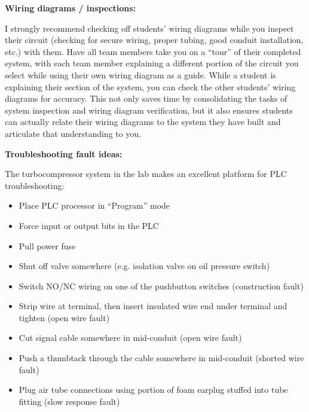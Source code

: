 







\noindent
{\bf Wiring diagrams / inspections:}

I strongly recommend checking off students' wiring diagrams while you inspect their circuit (checking for secure wiring, proper tubing, good conduit installation, etc.) with them.  Have all team members take you on a ``tour'' of their completed system, with each team member explaining a different portion of the circuit you select while using their own wiring diagram as a guide.  While a student is explaining their section of the system, you can check the other students' wiring diagrams for accuracy.  This not only saves time by consolidating the tasks of system inspection and wiring diagram verification, but it also ensures students can actually relate their wiring diagrams to the system they have built and articulate that understanding to you.

\vskip 10pt

\goodbreak

\noindent
{\bf Troubleshooting fault ideas:}

The turbocompressor system in the lab makes an excellent platform for PLC troubleshooting:

\begin{itemize}
\goodbreak
\item{} Place PLC processor in ``Program'' mode
\item{} Force input or output bits in the PLC
\item{} Pull power fuse
\item{} Shut off valve somewhere (e.g. isolation valve on oil pressure switch)
\item{} Switch NO/NC wiring on one of the pushbutton switches (construction fault)
\item{} Strip wire at terminal, then insert insulated wire end under terminal and tighten (open wire fault)
\item{} Cut signal cable somewhere in mid-conduit (open wire fault)
\item{} Push a thumbtack through the cable somewhere in mid-conduit (shorted wire fault)
\item{} Plug air tube connections using portion of foam earplug stuffed into tube fitting (slow response fault)
\end{itemize}











